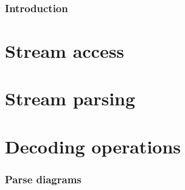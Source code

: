 
\section{Introduction}


\clearpage
\part{Stream access}
\clearpage
\part{Stream parsing}
\clearpage
\part{Decoding operations}




\appendix

\clearpage
\section{Parse diagrams}

\clearpage
